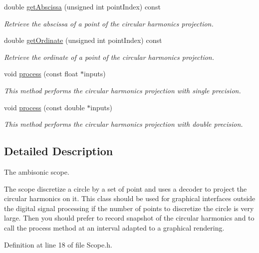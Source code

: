 \begin{DoxyCompactItemize}
double \hyperlink{class_hoa2_d_1_1_scope_a80ed96d8739e5ceed58b5b696cd74a24}{get\-Abscissa} (unsigned int point\-Index) const 
\begin{DoxyCompactList}\small\item\em Retrieve the abscissa of a point of the circular harmonics projection. \end{DoxyCompactList}\item 
double \hyperlink{class_hoa2_d_1_1_scope_a10b2a1628c57da3d121ed86c73405702}{get\-Ordinate} (unsigned int point\-Index) const 
\begin{DoxyCompactList}\small\item\em Retrieve the ordinate of a point of the circular harmonics projection. \end{DoxyCompactList}\item 
void \hyperlink{class_hoa2_d_1_1_scope_a038059aad5409d02fb511d3443a5cbce}{process} (const float $\ast$inputs)
\begin{DoxyCompactList}\small\item\em This method performs the circular harmonics projection with single precision. \end{DoxyCompactList}\item 
void \hyperlink{class_hoa2_d_1_1_scope_aa3e07e453b32b6a6334a0945bf102f53}{process} (const double $\ast$inputs)
\begin{DoxyCompactList}\small\item\em This method performs the circular harmonics projection with double precision. \end{DoxyCompactList}\end{DoxyCompactItemize}


\subsection{Detailed Description}
The ambisonic scope. 

The scope discretize a circle by a set of point and uses a decoder to project the circular harmonics on it. This class should be used for graphical interfaces outside the digital signal processing if the number of points to discretize the circle is very large. Then you should prefer to record snapshot of the circular harmonics and to call the process method at an interval adapted to a graphical rendering. 

Definition at line 18 of file Scope.\-h.



